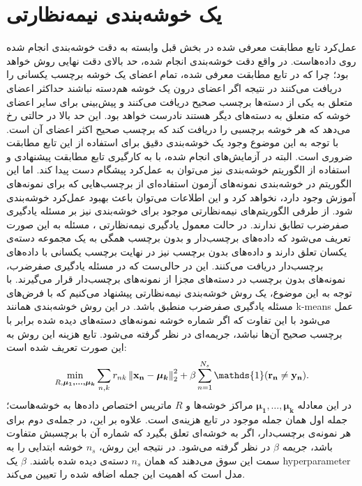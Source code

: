 \section{یک خوشه‌بندی نیمه‌نظارتی}\label{clustering_method}
عمل‌کرد تابع مطابقت معرفی شده در بخش قبل وابسته به دقت خوشه‌بندی انجام شده روی داده‌هاست. در واقع دقت خوشه‌بندی انجام شده، حد بالای دقت نهایی روش خواهد بود؛ چرا که در تابع مطابقت معرفی شده، تمام اعضای یک خوشه برچسب یکسانی را دریافت می‌کنند در نتیجه اگر اعضای درون یک خوشه هم‌دسته نباشند حداکثر اعضای متعلق به یکی از دسته‌ها برچسب صحیح دریافت می‌کنند و پیش‌بینی برای سایر اعضای خوشه که متعلق به دسته‌های دیگر هستند نادرست خواهد بود.
 این حد بالا  در حالتی رخ می‌دهد که هر خوشه برچسبی را دریافت کند که برچسب صحیح  اکثر اعضای آن است. با توجه به این موضوع وجود یک خوشه‌بندی دقیق برای استفاده از این تابع مطابقت ضروری است. البته در آزمایش‌های انجام شده، با به کارگیری تابع مطابقت پیشنهادی و استفاده از  الگوریتم خوشه‌بندی
 \cite{kmeans}
نیز می‌توان به عمل‌کرد پیشگام دست پیدا کند. اما این الگوریتم در خوشه‌بندی نمونه‌های آزمون استفاده‌ای از برچسب‌هایی که برای نمونه‌های آموزش وجود دارد، نخواهد کرد و این اطلاعات می‌توان باعث بهبود عمل‌کرد خوشه‌بندی شود. از طرفی الگوریتم‌های نیمه‌نظارتی موجود برای خوشه‌بندی نیز بر مسئله یادگیری صفرضرب تطابق ندارند. در حالت معمول یادگیری نیمه‌نظارتی \cite{chapel06}، مسئله به این صورت تعریف می‌شود که داده‌های برچسب‌دار و بدون برچسب همگی به یک مجموعه دسته‌ی یکسان تعلق دارند و داده‌های بدون برچسب نیز در نهایت برچسب یکسانی با داده‌های برچسب‌دار دریافت می‌کنند. این در حالی‌ست که در مسئله یادگیری صفرضرب، نمونه‌های بدون برچسب در دسته‌های مجزا از نمونه‌های برچسب‌دار قرار می‌گیرند. با توجه به این موضوع، یک روش خوشه‌بندی نیمه‌نظارتی پیشنهاد می‌کنیم که با فرض‌های مسئله یادگیری صفرضرب منطبق باشد. در این روش خوشه‌بندی همانند k-means عمل می‌شود با این تفاوت که اگر شماره خوشه نمونه‌های دسته‌های دیده شده  برابر با برچسب صحیح آن‌ها نباشد، جریمه‌ای در نظر گرفته می‌شود. تابع هزینه این روش به این صورت تعریف شده است:
\begin{equation} \label{eq:my_clustering}
\min_{R, \boldsymbol{\mu_1, \ldots, \mu_k }}  \sum_{n,k} r_{nk} \normtwo{\mathbf{x_n} - \boldsymbol{\mu_k}} +
 \beta \sum_{n=1}^{N_s} \mathds{1}(\mathbf{r_n} \neq \mathbf{y_n}).
\end{equation}
در این معادله $ \boldsymbol{\mu_1, \ldots, \mu_k }$ مراکز خوشه‌ها و $R$ ماتریس اختصاص داده‌ها به خوشه‌هاست؛ جمله اول همان جمله موجود در تابع هزینه‌ی
است. علاوه بر این، در جمله‌ی دوم برای هر نمونه‌ی برچسب‌دار، اگر به خوشه‌ای تعلق بگیرد که شماره آن با برچسبش متفاوت باشد، جریمه $\beta$ در نظر گرفته می‌شود. در نتیجه این روش، $n_s$ خوشه ابتدایی را به سمت این سوق می‌دهند که همان $n_s$ دسته‌ی دیده شده باشند.  $\beta$ یک \gls{hyperparameter} مدل است که اهمیت این جمله اضافه شده را تعیین می‌کند.

